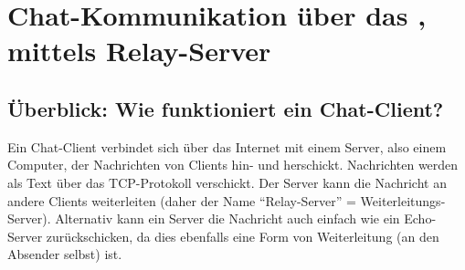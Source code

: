 \begin{myexercise}[Reflexionsfragen]
\end{myexercise}
\section{\texorpdfstring{Chat-Kommunikation über das , mittels Relay-Server}{Chat-Kommunikation über das LAN, mittels Relay-Server}}




\subsection{Überblick: Wie funktioniert ein Chat-Client?}

Ein Chat-Client verbindet sich über das Internet mit einem Server, also einem Computer, der Nachrichten von Clients hin- und herschickt. Nachrichten werden als Text über das \gls{TCP}-Protokoll verschickt. Der Server kann die Nachricht an andere Clients weiterleiten (daher der Name \enquote{Relay-Server} = Weiterleitungs-Server). Alternativ kann ein Server die Nachricht auch einfach wie ein Echo-Server zurückschicken, da dies ebenfalls eine Form von Weiterleitung (an den Absender selbst) ist.

